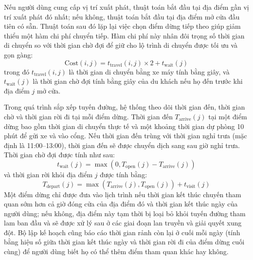 \documentclass[a4paper,12pt]{report}
\begin{document}
Nếu người dùng cung cấp vị trí xuất phát, thuật toán bắt đầu tại địa điểm gần vị trí xuất phát đó nhất; nếu không, thuật toán bắt đầu tại địa điểm mở cửa đầu tiên có sẵn. Thuật toán sau đó lặp lại việc chọn điểm dừng tiếp theo giúp giảm thiểu một hàm chi phí chuyển tiếp. Hàm chi phí này nhân đôi trọng số thời gian di chuyển so với thời gian chờ đợi để giữ cho lộ trình di chuyển được tối ưu và gọn gàng:
\[
\text{Cost}(i, j) = t_{\text{travel}}(i, j) \times 2 + t_{\text{wait}}(j)
\]
trong đó $t_{\text{travel}}(i, j)$ là thời gian di chuyển bằng xe máy tính bằng giây, và $t_{\text{wait}}(j)$ là thời gian chờ đợi tính bằng giây của du khách nếu họ đến trước khi địa điểm $j$ mở cửa.

Trong quá trình sắp xếp tuyến đường, hệ thống theo dõi thời gian đến, thời gian chờ và thời gian rời đi tại mỗi điểm dừng. Thời gian đến $T_{\text{arrive}}(j)$ tại một điểm dừng bao gồm thời gian di chuyển thực tế và một khoảng thời gian dự phòng 10 phút để gửi xe và vào cổng. Nếu thời gian đến trùng với thời gian nghỉ trưa (mặc định là 11:00--13:00), thời gian đến sẽ được chuyển dịch sang sau giờ nghỉ trưa. Thời gian chờ đợi được tính như sau:
\[
t_{\text{wait}}(j) = \max(0, T_{\text{open}}(j) - T_{\text{arrive}}(j))
\]
và thời gian rời khỏi địa điểm $j$ được tính bằng:
\[
T_{\text{depart}}(j) = \max(T_{\text{arrive}}(j), T_{\text{open}}(j)) + t_{\text{visit}}(j)
\]
Một điểm dừng chỉ được đưa vào lịch trình nếu thời gian kết thúc chuyến tham quan sớm hơn cả giờ đóng cửa của địa điểm đó và thời gian kết thúc ngày của người dùng; nếu không, địa điểm này tạm thời bị loại bỏ khỏi tuyến đường tham lam ban đầu và sẽ được xử lý sau ở các giai đoạn lan truyền và giải quyết xung đột. Bộ lập kế hoạch cũng báo cáo thời gian rảnh còn lại ở cuối mỗi ngày (tính bằng hiệu số giữa thời gian kết thúc ngày và thời gian rời đi của điểm dừng cuối cùng) để người dùng biết họ có thể thêm điểm tham quan khác hay không.
\end{document}
